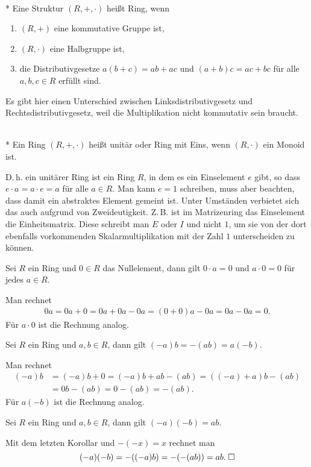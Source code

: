 \begin{Definition}[Ring]\mbox{}\\*
Eine Struktur $(R,+,\cdot)$ heißt Ring, wenn
\begin{enumerate}
\item $(R,+)$ eine kommutative Gruppe ist,
\item $(R,\cdot)$ eine Halbgruppe ist,
\item die Distributivgesetze $a(b+c)=ab+ac$ und $(a+b)c=ac+bc$
für alle $a,b,c\in R$ erfüllt sind.
\end{enumerate}
\end{Definition}
Es gibt hier einen Unterschied zwischen Linksdistributivgesetz
und Rechtsdistributivgesetz, weil die Multiplikation nicht
kommutativ sein braucht.

\begin{Definition}\mbox{}\\*
Ein Ring $(R,+,\cdot)$ heißt unitär oder Ring mit Eins, wenn
$(R,\cdot)$ ein Monoid ist.
\end{Definition}
D.\,h. ein unitärer Ring ist ein Ring $R$, in dem es ein Einselement
$e$ gibt, so dass $e\cdot a=a\cdot e=a$ für alle $a\in R$. Man kann
$e=1$ schreiben, muss aber beachten, dass damit ein abstraktes Element
gemeint ist. Unter Umständen verbietet sich das auch aufgrund von
Zweideutigkeit. Z.\,B. ist im Matrizenring das Einselement die
Einheitsmatrix. Diese schreibt man $E$ oder $I$ und nicht $1$, um sie
von der dort ebenfalls vorkommenden Skalarmultiplikation mit der
Zahl $1$ unterscheiden zu können.

\begin{Korollar}
Sei $R$ ein Ring und $0\in R$ das Nullelement, dann gilt
$0\cdot a = 0$ und $a\cdot 0 = 0$ für jedes $a\in R$.
\end{Korollar}
 Man rechnet
\begin{align*}
0a = 0a+0 = 0a+0a-0a = (0+0)a-0a = 0a-0a = 0.
\end{align*}
Für $a\cdot 0$ ist die Rechnung analog.\;\qedsymbol

\begin{Korollar}
Sei $R$ ein Ring und $a,b\in R$, dann gilt $(-a)b = -(ab) = a(-b)$.
\end{Korollar}
 Man rechnet
\begin{align*}
(-a)b &= (-a)b+0 = (-a)b+ab-(ab) = ((-a)+a)b-(ab)\\
&= 0b-(ab) = 0-(ab) = -(ab).
\end{align*}
Für $a(-b)$ ist die Rechnung analog.\;\qedsymbol
\begin{Korollar}
Sei $R$ ein Ring und $a,b\in R$, dann gilt $(-a)(-b)=ab$.
\end{Korollar}
 Mit dem letzten Korollar und $-(-x)=x$ rechnet man
\[(-a)(-b) = -((-a)b) = -(-(ab)) = ab.\;\Box\]

